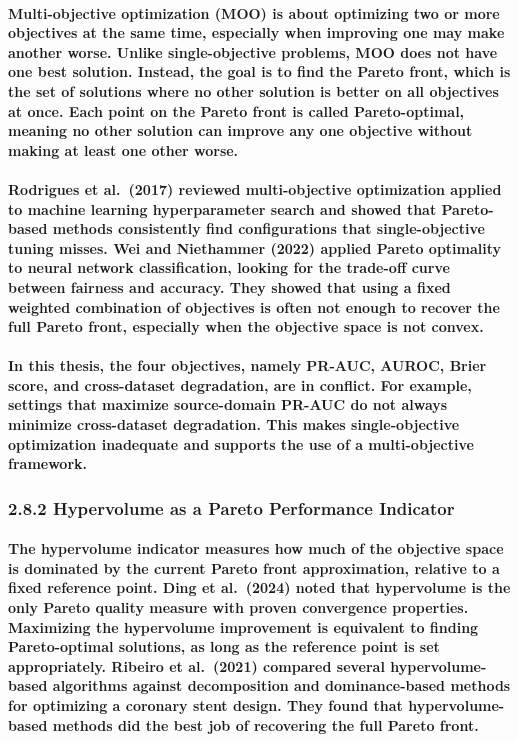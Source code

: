 \paragraph{Multi-objective optimization (MOO) is about optimizing two or more objectives at the same time, especially when improving one may make another worse. Unlike single-objective problems, MOO does not have one best solution. Instead, the goal is to find the Pareto front, which is the set of solutions where no other solution is better on all objectives at once. Each point on the Pareto front is called Pareto-optimal, meaning no other solution can improve any one objective without making at least one other worse.}

\paragraph{Rodrigues et al. (2017) reviewed multi-objective optimization applied to machine learning hyperparameter search and showed that Pareto-based methods consistently find configurations that single-objective tuning misses. Wei and Niethammer (2022) applied Pareto optimality to neural network classification, looking for the trade-off curve between fairness and accuracy. They showed that using a fixed weighted combination of objectives is often not enough to recover the full Pareto front, especially when the objective space is not convex.}

\paragraph{In this thesis, the four objectives, namely PR-AUC, AUROC, Brier score, and cross-dataset degradation, are in conflict. For example, settings that maximize source-domain PR-AUC do not always minimize cross-dataset degradation. This makes single-objective optimization inadequate and supports the use of a multi-objective framework.}

\subsubsection{2.8.2 Hypervolume as a Pareto Performance
Indicator}\label{hypervolume-as-a-pareto-performance-indicator}

\paragraph{The hypervolume indicator measures how much of the objective space is dominated by the current Pareto front approximation, relative to a fixed reference point. Ding et al. (2024) noted that hypervolume is the only Pareto quality measure with proven convergence properties. Maximizing the hypervolume improvement is equivalent to finding Pareto-optimal solutions, as long as the reference point is set appropriately. Ribeiro et al. (2021) compared several hypervolume-based algorithms against decomposition and dominance-based methods for optimizing a coronary stent design. They found that hypervolume-based methods did the best job of recovering the full Pareto front.}

